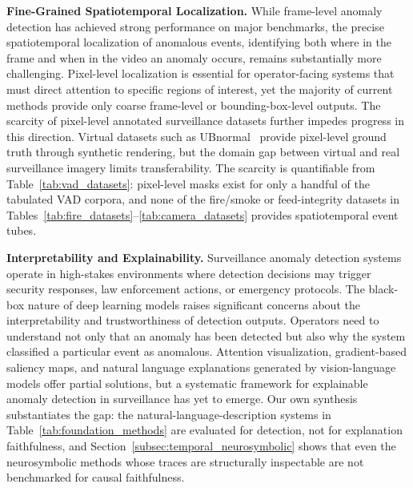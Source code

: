 \documentclass[10pt,a4paper]{article}
\begin{document}
\noindent\textbf{Fine-Grained Spatiotemporal Localization.} While frame-level anomaly detection has achieved strong performance on major benchmarks, the precise spatiotemporal localization of anomalous events, identifying both where in the frame and when in the video an anomaly occurs, remains substantially more challenging. Pixel-level localization is essential for operator-facing systems that must direct attention to specific regions of interest, yet the majority of current methods provide only coarse frame-level or bounding-box-level outputs. The scarcity of pixel-level annotated surveillance datasets further impedes progress in this direction. Virtual datasets such as UBnormal~\citep{acsintoae2022ubnormal} provide pixel-level ground truth through synthetic rendering,  but the domain gap between virtual and real surveillance imagery limits transferability. The scarcity is quantifiable from Table~\ref{tab:vad_datasets}: pixel-level masks exist for only a handful of the tabulated VAD corpora, and none of the fire/smoke or feed-integrity datasets in Tables~\ref{tab:fire_datasets}--\ref{tab:camera_datasets} provides spatiotemporal event tubes.

\noindent\textbf{Interpretability and Explainability.} Surveillance anomaly detection systems operate in high-stakes environments where detection decisions may trigger security responses, law enforcement actions, or emergency protocols. The black-box nature of deep learning models raises significant concerns about the interpretability and trustworthiness of detection outputs. Operators need to understand not only that an anomaly has been detected but also why the system classified a particular event as anomalous. Attention visualization, gradient-based saliency maps, and natural language explanations generated by vision-language models offer partial solutions, but a systematic framework for explainable anomaly detection in surveillance has yet to emerge. Our own synthesis substantiates the gap: the natural-language-description systems in Table~\ref{tab:foundation_methods} are evaluated for detection, not for explanation faithfulness, and Section~\ref{subsec:temporal_neurosymbolic} shows that even the neurosymbolic methods whose traces are structurally inspectable are not benchmarked for causal faithfulness.
\end{document}
